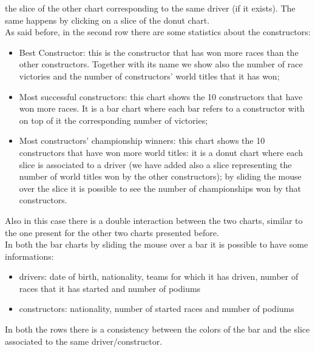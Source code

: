 \documentclass[11pt,twocolumn,letterpaper]{article}
\begin{document}
the slice of the other chart corresponding to the same driver (if it exists). The same happens by clicking on a slice of the donut chart.\\
As said before, in the second row there are some statistics about the constructors:
\begin{itemize}
	\item Best Constructor: this is the constructor that has won more races than the other constructors. Together with its name we show also the number of race victories and
	the number of constructors' world titles that it has won;
	\item Most successful constructors: this chart shows the 10 constructors that have won more races. It is a bar chart where each bar refers to a constructor with on top of
	it the corresponding number of victories;
	\item Most constructors' championship winners: this chart shows the 10 constructors that have won more world titles: it is a donut chart where each slice is associated to
	a driver (we have added also a slice representing the number of world titles won by the other constructors); by sliding the mouse over the slice it is possible to see the
	number of championships won by that constructors.
\end{itemize}
Also in this case there is a double interaction between the two charts, similar to the one present for the other two charts presented before.\\
In both the bar charts by sliding the mouse over a bar it is possible to have some informations:
\begin{itemize}
	\item drivers: date of birth, nationality, teams for which it has driven, number of races that it has started and number of podiums
	\item constructors: nationality, number of started races and number of podiums
\end{itemize}
In both the rows there is a consistency between the colors of the bar and the slice associated to the same driver/constructor.
\end{document}
